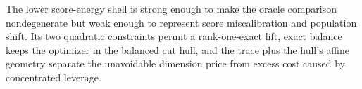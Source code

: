 The lower score-energy shell is strong enough to make the oracle comparison nondegenerate but weak enough to represent score miscalibration and population shift. Its two quadratic constraints permit a rank-one-exact lift, exact balance keeps the optimizer in the balanced cut hull, and the trace plus the hull's affine geometry separate the unavoidable dimension price from excess cost caused by concentrated leverage.